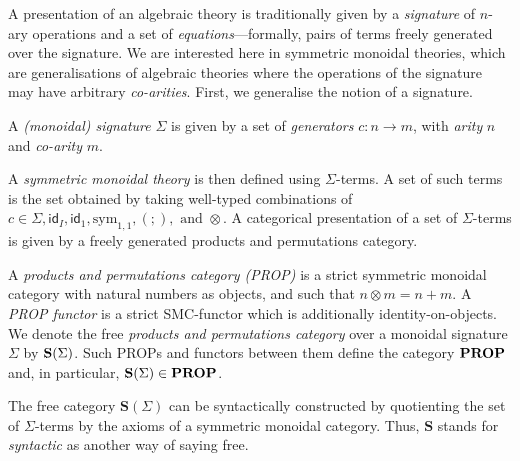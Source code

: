 A presentation of an algebraic theory is traditionally given by a \textit{signature} of $n$-ary operations and a set of \textit{equations}---formally,  pairs of terms freely generated over the signature.  We are interested here in symmetric monoidal theories, which are generalisations of algebraic theories where the operations of the signature may have arbitrary \textit{co-arities}.  
First,  we generalise the notion of a signature. 
\begin{definition}
A \textit{(monoidal) signature} $\Sigma$ is given by a set of \textit{generators} $c: n \to m$,  with \textit{arity} $n$ and \textit{co-arity} $m$.  %
\end{definition}


A \textit{symmetric monoidal theory} is then defined using $\Sigma$-terms.
A set of such terms is the set obtained by taking well-typed combinations of $c \in \Sigma, \textsf{id}_{I}, \textsf{id}_{1}, \text{sym}_{1,1}, (;), \text{ and } \otimes$.
A categorical presentation of a set of $\Sigma$-terms is given by a freely generated products and permutations category.

\begin{definition}
A \textit{products and permutations category (PROP)} is a strict symmetric monoidal category with natural numbers as objects,  and such that $n \otimes m = n+m$.  
A \textit{PROP functor} is a strict SMC-functor which is additionally identity-on-objects.
We denote the free \textit{products and permutations category} over a monoidal signature $\Sigma$ by $\mathbf{S}(\Sigma)$.
Such PROPs and functors between them define the category $\mathbf{PROP}$ and, in particular, $\mathbf{S}(\Sigma) \in \mathbf{PROP}$.
\end{definition}
The free category $\textbf{S}(\Sigma)$ can be syntactically constructed by quotienting the set of $\Sigma$-terms by the axioms of a symmetric monoidal category.
Thus, $\textbf{S}$ stands for \textit{syntactic} as another way of saying free.

